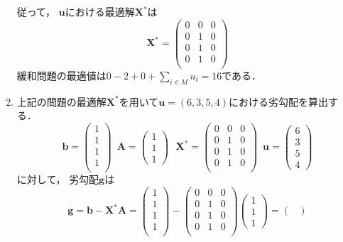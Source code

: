 \documentclass[a4paper,11pt]{jsarticle}
\numberwithin{theorem}{section}  %
\numberwithin{equation}{section} %
\begin{document}
\begin{enumerate}
従って，
$\bm{u}$における最適解$\bm{X}^*$は
\[
\bm{X}^* = \begin{pmatrix}
0 & 0   & 0\\
0 & 1 & 0\\
0 & 1 & 0\\
0 & 1 & 0\\
\end{pmatrix}
\]
緩和問題の最適値は$0- 2+0 + \sum_{i \in M} u_i = 16 $である．
\item
上記の問題の最適解$\bm{X}^*$を用いて$\bm{u} = (6,3,5,4)$における劣勾配を算出する．\\
\[
\bm{b} = \begin{pmatrix}
1 \\ 1 \\ 1 \\ 1\\
\end{pmatrix} \,\,\,
\bm{A} = \begin{pmatrix}
1 \\ 1 \\ 1
\end{pmatrix}
\,\,\,\,
\bm{X}^* = \begin{pmatrix}
0 & 0   & 0\\
0 & 1 & 0\\
0 & 1 & 0\\
0 & 1 & 0\\
\end{pmatrix}
\,\,\,
\bm{u} = \begin{pmatrix}
6 \\ 3 \\ 5 \\ 4
\end{pmatrix}
\]に対して，
劣勾配$\bm{g}$は
\[
\bm{g} = \bm{b}-\bm{X}^*\bm{A} = \begin{pmatrix}
1 \\ 1 \\ 1 \\ 1\\
\end{pmatrix} - \begin{pmatrix}
0 & 0   & 0\\
0 & 1 & 0\\
0 & 1 & 0\\
0 & 1 & 0\\
\end{pmatrix} \begin{pmatrix}
1 \\ 1 \\ 1
\end{pmatrix} = \begin{pmatrix}

\end{pmatrix}\]
\end{enumerate}
\end{document}
